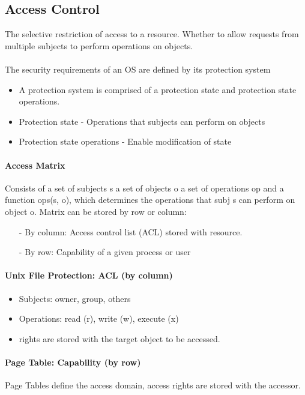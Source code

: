 \subsection{Access Control}
The selective restriction of access to a resource. Whether to allow requests from multiple subjects to perform operations on objects.\\
\\
The security requirements of an OS are defined by
its protection system
\begin{itemize}
    \item A protection system is comprised of a protection
    state and protection state operations.
    \item Protection state - Operations that subjects can
    perform on objects
    \item Protection state operations - Enable modification
    of state
\end{itemize}

\paragraph{Access Matrix}
Consists of a set of subjects s a set of objects o a set of operations op and a function ops(s, o), which determines the operations that subj s can perform on object o. Matrix can be stored by row or column:
\begin{itemize}
    \item[-]By column: Access control list (ACL) stored with resource.
    \item[-]By row: Capability of a given process or user
\end{itemize}

\paragraph{Unix File Protection: ACL (by column)}
\begin{itemize}
    \item Subjects: owner, group, others
    \item Operations: read (r), write (w), execute (x)
    \item rights are stored with the target object to be accessed.
\end{itemize}

\paragraph{Page Table: Capability (by row)}
Page Tables define the access domain, access rights are stored with the accessor.

